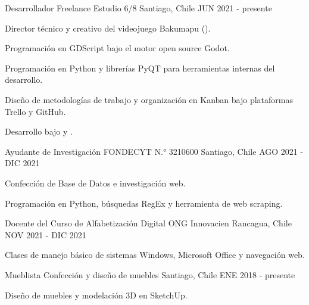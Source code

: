 

\begin{cventries}

  \cventry
    {Desarrollador Freelance} %
    {Estudio 6/8} %
    {Santiago, Chile} %
    {JUN 2021 - presente} %
    {
      \begin{cvitems} %
        \item {Director técnico y creativo del videojuego Bakumapu ().}
        \item {Programación en GDScript bajo el motor open source Godot.}
        \item {Programación en Python y librerías PyQT para herramientas internas del desarrollo.}
        \item {Diseño de metodologías de trabajo y organización en Kanban bajo plataformas Trello y GitHub.}
        \item {Desarrollo bajo  y .}
      \end{cvitems}
    }

  \cventry
    {Ayudante de Investigación} %
    {FONDECYT N.° 3210600} %
    {Santiago, Chile} %
    {AGO 2021 - DIC 2021} %
    {
      \begin{cvitems} %
        \item {Confección de Base de Datos e investigación web.}
        \item {Programación en Python, búsquedas RegEx y herramienta de web scraping.}
      \end{cvitems}
    }

  \cventry
    {Docente del Curso de Alfabetización Digital} %
    {ONG Innovacien} %
    {Rancagua, Chile} %
    {NOV 2021 - DIC 2021} %
    {
      \begin{cvitems} %
        \item {Clases de manejo básico de sistemas Windows, Microsoft Office y navegación web.}
      \end{cvitems}
    }

  \cventry
    {Mueblista} %
    {Confección y diseño de muebles} %
    {Santiago, Chile} %
    {ENE 2018 - presente} %
    {
      \begin{cvitems} %
        \item {Diseño de muebles y modelación 3D en SketchUp.}
      \end{cvitems}
    }


\end{cventries}
